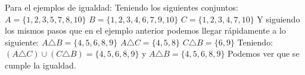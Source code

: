 Para el ejemplos de igualdad:\newline
Teniendo los siguientes conjuntos:\newline
$A = \{1,2,3,5,7,8,10\}$\newline
$B = \{1,2,3,4,6,7,9,10\}$\newline
$C = \{1,2,3,4,7,10\}$\newline
Y siguiendo los mismos pasos que en el ejemplo anterior podemos llegar rápidamente a lo siguiente:\newline
$A \triangle B = \{4,5,6,8,9\}$\newline
$A \triangle C = \{4,5,8\}$\newline
$C \triangle B = \{6,9\}$\newline
Teniendo: $(A \triangle C) \cup (C \triangle B) = \{4,5,6,8,9\}$ y $A \triangle B = \{4,5,6,8,9\}$ Podemos ver que se cumple la igualdad.